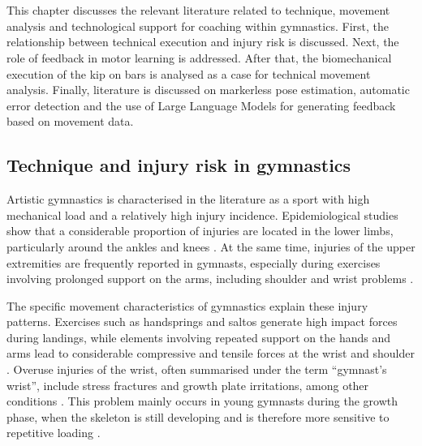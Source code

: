 \chapter{}%
\label{ch:stand-van-zaken}

This chapter discusses the relevant literature related to technique, movement analysis and technological support for coaching within gymnastics. First, the relationship between technical execution and injury risk is discussed. Next, the role of feedback in motor learning is addressed. After that, the biomechanical execution of the kip on bars is analysed as a case for technical movement analysis. Finally, literature is discussed on markerless pose estimation, automatic error detection and the use of Large Language Models for generating feedback based on movement data.

\section{Technique and injury risk in gymnastics}
\label{sec:techniek-blessures}
Artistic gymnastics is characterised in the literature as a sport with high mechanical load and a relatively high injury incidence. Epidemiological studies show that a considerable proportion of injuries are located in the lower limbs, particularly around the ankles and knees \autocite{Hart2018,Thomas2019}. At the same time, injuries of the upper extremities are frequently reported in gymnasts, especially during exercises involving prolonged support on the arms, including shoulder and wrist problems \autocite{Hart2018,Concannon2020}. 

The specific movement characteristics of gymnastics explain these injury patterns. Exercises such as handsprings and saltos generate high impact forces during landings, while elements involving repeated support on the hands and arms lead to considerable compressive and tensile forces at the wrist and shoulder \autocite{Hart2018}. Overuse injuries of the wrist, often summarised under the term ``gymnast’s wrist'', include stress fractures and growth plate irritations, among other conditions \autocite{Concannon2020}. This problem mainly occurs in young gymnasts during the growth phase, when the skeleton is still developing and is therefore more sensitive to repetitive loading \autocite{Wolf2020,Concannon2020}.

